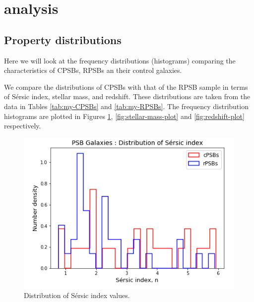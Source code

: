 \section{analysis}
\label{sec:analysis}

\subsection{Property distributions}
Here we will look at the frequency distributions (histograms) comparing the characteristics of CPSBs, RPSBs an their control galaxies.

We compare the distributions of CPSBs with that of the RPSB sample in terms of S\'ersic index, stellar mass, and redshift. These distributions are taken from the data in Tables \ref{tab:my-CPSBs} and \ref{tab:my-RPSBs}. The frequency distribution histograms are plotted in Figures \ref{fig:Sersic-plot}, \ref{fig:stellar-mass-plot} and \ref{fig:redshift-plot} respectively.

\begin{figure}
    \centering
    \includegraphics[width=\columnwidth]{images/Seric-index-distribution.png}
    \caption{Distribution of S\'ersic index values.}
    \label{fig:Sersic-plot}
\end{figure}

